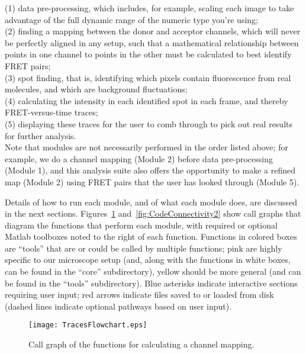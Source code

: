 \documentclass[11pt]{article}
\begin{document}
\noindent (1) data pre-processing, which includes, for example, scaling each image to take advantage of the full dynamic range of the numeric type you're using; \\

\noindent (2) finding a mapping between the donor and acceptor channels, which will never be perfectly aligned in any setup, such that a mathematical relationship between points in one channel to points in the other must be calculated to best identify FRET pairs; \\

\noindent (3) spot finding, that is, identifying which pixels contain fluorescence from real molecules, and which are background fluctuations; \\

\noindent (4) calculating the intensity in each identified spot in each frame, and thereby FRET-versus-time traces; \\

\noindent (5) displaying these traces for the user to comb through to pick out real results for further analysis.  \\

\noindent Note that modules are not necessarily performed in the order listed above; for example, we do a channel mapping (Module 2) before data pre-processing (Module 1), and this analysis suite also offers the opportunity to make a refined map (Module 2) using FRET pairs that the user has looked through (Module 5).

Details of how to run each module, and of what each module does, are discussed in the next sections.  Figures~\ref{fig:CodeConnectivity1} and~\ref{fig:CodeConnectivity2} show call graphs that diagram the functions that perform each module, with required or optional Matlab toolboxes noted to the right of each function. Functions in colored boxes are ``tools'' that are or could be called by multiple functions; pink are highly specific to our microscope setup (and, along with the functions in white boxes, can be found in the ``core'' subdirectory), yellow should be more general (and can be found in the ``tools'' subdirectory).  Blue asterisks indicate interactive sections requiring user input; red arrows indicate files saved to or loaded from disk (dashed lines indicate optional pathways based on user input).

\begin{figure}[!p]
\begin{center}
\texttt{[image: TracesFlowchart.eps]}
\caption{Call graph of the functions for calculating a channel mapping.}
\label{fig:CodeConnectivity1}
\end{center}
\end{figure}
\end{document}
